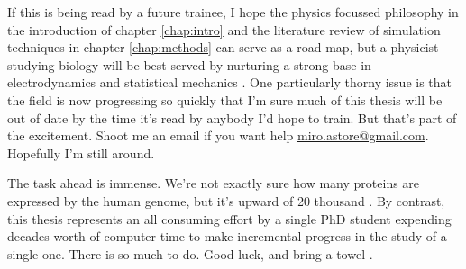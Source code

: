 If this is being read by a future trainee, I hope the physics focussed philosophy in the introduction of chapter \ref{chap:intro} and the literature review of simulation techniques in chapter \ref{chap:methods} can serve as a road map, but a physicist studying biology will be best served by nurturing a strong base in electrodynamics and statistical mechanics \cite{griffiths2017, reif2009, zuckerman2010}. One particularly thorny issue is that the field is now progressing so quickly that I'm sure much of this thesis will be out of date by the time it's read by anybody I'd hope to train. But that's part of the excitement. Shoot me an email if you want help \href{mailto:miro.astore@gmailcom}{miro.astore@gmail.com}. Hopefully I'm still around.

The task ahead is immense. We're not exactly sure how many proteins are expressed by the human genome, but it's upward of 20 thousand \cite{salzberg2018}. By contrast, this thesis represents an all consuming effort by a single PhD student expending decades worth of computer time to make incremental progress in the study of a single one. There is so much to do. Good luck, and bring a towel \cite{adams1979}. 
